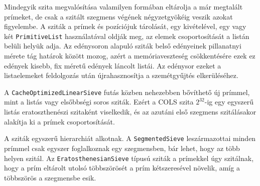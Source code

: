 Mindegyik szita megvalósítása valamilyen formában eltárolja a már megtalált prímeket, de csak a szitált szegmens végének négyzetgyökéig veszik azokat figyelembe.
A sziták a prímek és pozíciójuk tárolását, egy kivételével, egy vagy két \texttt{PrimitiveList} használatával oldják meg, az elemek csoportosítását a listán belüli helyük adja.
Az edénysoron alapuló sziták belső edényeinek pillanatnyi mérete tág határok között mozog, azért a memóriaveszteség csökkentésére ezek ez edények kisebb, fix méretű edények láncolt listái.
Az edénysor ezeket a listaelemeket feldolgozás után újrahasznosítja a szemétgyűjtés elkerüléséhez.

A \texttt{CacheOptimizedLinearSieve} futás közben nehezebben bővíthető új prímmel, mint a listás vagy elsőbbségi soros sziták.
Ezért a COLS szita $2^{32}$-ig egy egyszerű listás eratoszthenészi szitaként viselkedik, és az azutáni első szegmens szitálásakor alakítja ki a prímek csoportosítását.

A sziták egyszerű hierarchiát alkotnak.
A \texttt{SegmentedSieve} leszármazottai minden prímmel csak egyszer foglalkoznak egy szegmensben, bár lehet, hogy az több helyen szitál.
Az \texttt{EratosthenesianSieve} típusú sziták a prímekkel úgy szitálnak, hogy a prím eltárolt utolsó többszörösét a prím kétszeresével növelik, amíg a többszörös a szegmensbe esik.

